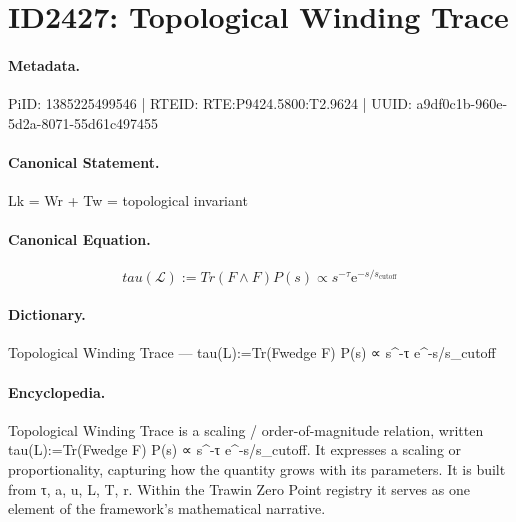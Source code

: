 \section*{ID2427: Topological Winding Trace}
\paragraph{Metadata.}
PiID: 1385225499546 | RTEID: RTE:P9424.5800:T2.9624 | UUID: a9df0c1b-960e-5d2a-8071-55d61c497455

\paragraph{Canonical Statement.}
Lk = Wr + Tw = topological invariant

\paragraph{Canonical Equation.}
\[
tau(\mathcal{L}):=Tr(F\wedge F) P(s) \propto s^{-\tau} \mathrm{e}^{-s/s_{\text{cutoff}}}
\]

\paragraph{Dictionary.}
Topological Winding Trace — tau(L):=Tr(Fwedge F) P(s) ∝ s\textasciicircum{}-τ e\textasciicircum{}-s/s\_cutoff

\paragraph{Encyclopedia.}
Topological Winding Trace is a scaling / order-of-magnitude relation, written tau(L):=Tr(Fwedge F) P(s) ∝ s\textasciicircum{}-τ e\textasciicircum{}-s/s\_cutoff. It expresses a scaling or proportionality, capturing how the quantity grows with its parameters. It is built from τ, a, u, L, T, r. Within the Trawin Zero Point registry it serves as one element of the framework's mathematical narrative.
